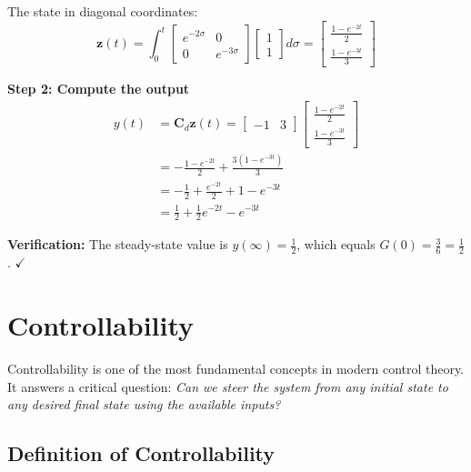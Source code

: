 \begin{example}
The state in diagonal coordinates:
\begin{equation}
\mathbf{z}(t) = \int_0^t \begin{bmatrix} e^{-2\sigma} & 0 \\ 0 & e^{-3\sigma} \end{bmatrix}\begin{bmatrix} 1 \\ 1 \end{bmatrix}d\sigma = \begin{bmatrix} \frac{1 - e^{-2t}}{2} \\ \frac{1 - e^{-3t}}{3} \end{bmatrix}
\end{equation}

\textbf{Step 2: Compute the output}
\begin{align}
y(t) &= \mathbf{C}_d\mathbf{z}(t) = \begin{bmatrix} -1 & 3 \end{bmatrix}\begin{bmatrix} \frac{1 - e^{-2t}}{2} \\ \frac{1 - e^{-3t}}{3} \end{bmatrix} \\
&= -\frac{1 - e^{-2t}}{2} + \frac{3(1 - e^{-3t})}{3} \\
&= -\frac{1}{2} + \frac{e^{-2t}}{2} + 1 - e^{-3t} \\
&= \frac{1}{2} + \frac{1}{2}e^{-2t} - e^{-3t}
\end{align}

\textbf{Verification:} The steady-state value is $y(\infty) = \frac{1}{2}$, which equals $G(0) = \frac{3}{6} = \frac{1}{2}$. $\checkmark$
\end{example}

\section{Controllability}
\label{sec:controllability}

Controllability is one of the most fundamental concepts in modern control theory. It answers a critical question: \textit{Can we steer the system from any initial state to any desired final state using the available inputs?}

\subsection{Definition of Controllability}

